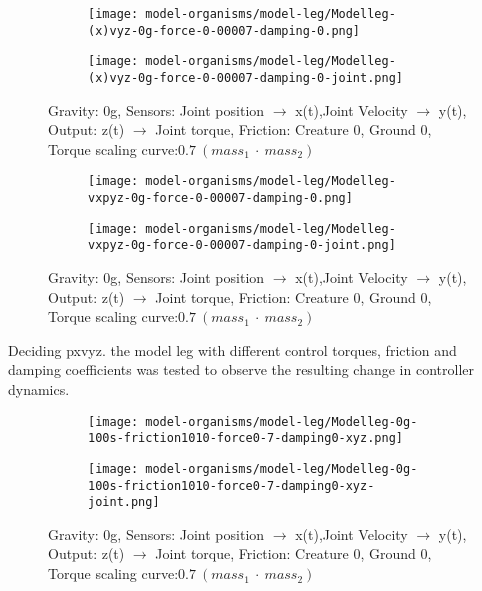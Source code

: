 \documentclass[main]{subfiles}
\begin{document}
\begin{figure}[H]
	\centering
		\begin{subfigure}[c]{0.45\textwidth}
	\texttt{[image: model-organisms/model-leg/Modelleg-(x)vyz-0g-force-0-00007-damping-0.png]}
		\end{subfigure}
	\begin{subfigure}[c]{0.45\textwidth}
	\texttt{[image: model-organisms/model-leg/Modelleg-(x)vyz-0g-force-0-00007-damping-0-joint.png]}
		\end{subfigure}
	\caption[Figure of chaotic behaviors in range 2.4-3.19]{Gravity: 0g, Sensors:  Joint position \(\rightarrow\) x(t),Joint Velocity \(\rightarrow\) y(t), Output: z(t) \(\rightarrow\) Joint torque, Friction: Creature 0, Ground 0, Torque scaling curve:\(0.7~(mass_1~\cdot~mass_2)\)}

	\label{figure:z-2.4-3.19-chaotictrajectories}
\end{figure}


\begin{figure}[H]
	\centering
		\begin{subfigure}[c]{0.45\textwidth}
	\texttt{[image: model-organisms/model-leg/Modelleg-vxpyz-0g-force-0-00007-damping-0.png]}
		\end{subfigure}
	\begin{subfigure}[c]{0.45\textwidth}
	\texttt{[image: model-organisms/model-leg/Modelleg-vxpyz-0g-force-0-00007-damping-0-joint.png]}
		\end{subfigure}
	\caption[Figure of chaotic behaviors in range 2.4-3.19]{Gravity: 0g, Sensors:  Joint position \(\rightarrow\) x(t),Joint Velocity \(\rightarrow\) y(t), Output: z(t) \(\rightarrow\) Joint torque, Friction: Creature 0, Ground 0, Torque scaling curve:\(0.7~(mass_1~\cdot~mass_2)\)}

	\label{figure:z-2.4-3.19-chaotictrajectories}
\end{figure}

Deciding pxvyz.  the model leg with different control torques, friction and damping coefficients was tested to observe the resulting change in controller dynamics. 

\begin{figure}[H]
	\centering
		\begin{subfigure}[c]{0.45\textwidth}
	\texttt{[image: model-organisms/model-leg/Modelleg-0g-100s-friction1010-force0-7-damping0-xyz.png]}
		\end{subfigure}
	\begin{subfigure}[c]{0.45\textwidth}
	\texttt{[image: model-organisms/model-leg/Modelleg-0g-100s-friction1010-force0-7-damping0-xyz-joint.png]}
		\end{subfigure}
	\caption[Figure of chaotic behaviors in range 2.4-3.19]{Gravity: 0g, Sensors:  Joint position \(\rightarrow\) x(t),Joint Velocity \(\rightarrow\) y(t), Output: z(t) \(\rightarrow\) Joint torque, Friction: Creature 0, Ground 0, Torque scaling curve:\(0.7~(mass_1~\cdot~mass_2)\)}

	\label{figure:z-2.4-3.19-chaotictrajectories}
\end{figure}
\end{document}
